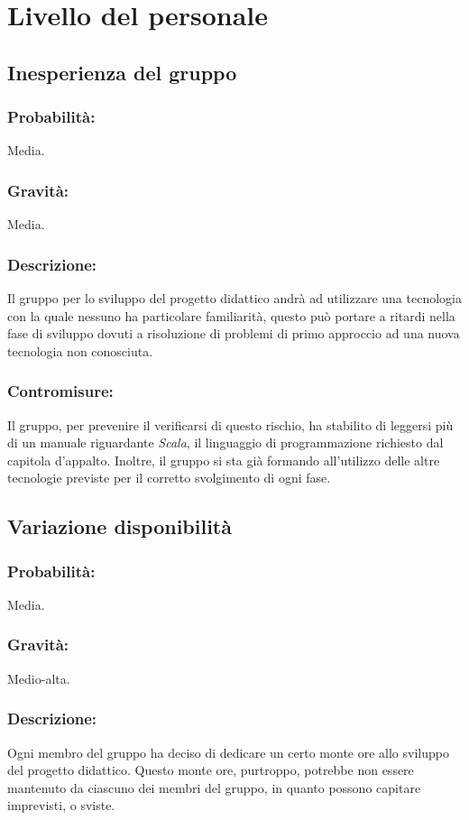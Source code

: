 \documentclass[a4paper]{report}
\begin{document}
		\section{Livello del personale}
			\subsection{Inesperienza del gruppo}
				\subsubsection{Probabilità:} 
					Media.
				\subsubsection{Gravità:} 
					Media.
				\subsubsection{Descrizione:} 
					Il gruppo per lo sviluppo del progetto didattico andrà ad utilizzare una tecnologia 
					con la quale nessuno ha particolare familiarità, questo può portare a ritardi 
					nella fase di sviluppo dovuti a risoluzione di problemi di primo approccio ad una 
					nuova tecnologia non conosciuta.
				\subsubsection{Contromisure:}
					Il gruppo, per prevenire il verificarsi di questo rischio, ha stabilito di leggersi
					più di un manuale riguardante \emph{Scala}, il linguaggio di programmazione richiesto
					dal capitola d'appalto. Inoltre, il gruppo si sta già formando all'utilizzo delle
					altre tecnologie previste per il corretto svolgimento di ogni fase.
			\subsection{Variazione disponibilità}
				\subsubsection{Probabilità:}
					Media.
				\subsubsection{Gravità:} 
					Medio-alta.
				\subsubsection{Descrizione:}
					Ogni membro del gruppo ha deciso di dedicare un certo monte ore allo sviluppo del 
					progetto didattico. Questo monte ore, purtroppo, potrebbe non essere mantenuto da 
					ciascuno dei membri del gruppo, in quanto possono capitare imprevisti, o sviste.
\end{document}
